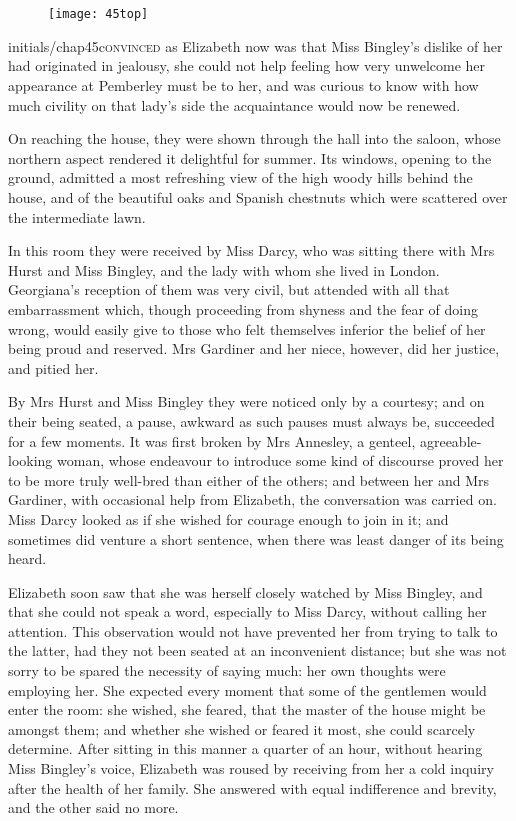 \chapter[Chapter \thechapter]{}
	
	
\begin{figure}[t!]
\centering
\texttt{[image: 45top]}
\end{figure}


\lettrine[lines=6,image=true]{initials/chap45c}{onvinced}  as Elizabeth now was that Miss Bingley's dislike of her had originated in jealousy, she could not help feeling how very unwelcome her appearance at Pemberley must be to her, and was curious to know with how much civility on that lady's side the acquaintance would now be renewed.

\zz
On reaching the house, they were shown through the hall into the saloon, whose northern aspect rendered it delightful for summer. Its windows, opening to the ground, admitted a most refreshing view of the high woody hills behind the house, and of the beautiful oaks and Spanish chestnuts which were scattered over the intermediate lawn.

In this room they were received by Miss Darcy, who was sitting there with Mrs Hurst and Miss Bingley, and the lady with whom she lived in London. Georgiana's reception of them was very civil, but attended with all that embarrassment which, though proceeding from shyness and the fear of doing wrong, would easily give to those who felt themselves inferior the belief of her being proud and reserved. Mrs Gardiner and her niece, however, did her justice, and pitied her.

By Mrs Hurst and Miss Bingley they were noticed only by a courtesy; and on their being seated, a pause, awkward as such pauses must always be, succeeded for a few moments. It was first broken by Mrs Annesley, a genteel, agreeable-looking woman, whose endeavour to introduce some kind of discourse proved her to be more truly well-bred than either of the others; and between her and Mrs Gardiner, with occasional help from Elizabeth, the conversation was carried on. Miss Darcy looked as if she wished for courage enough to join in it; and sometimes did venture a short sentence, when there was least danger of its being heard.

Elizabeth soon saw that she was herself closely watched by Miss Bingley, and that she could not speak a word, especially to Miss Darcy, without calling her attention. This observation would not have prevented her from trying to talk to the latter, had they not been seated at an inconvenient distance; but she was not sorry to be spared the necessity of saying much: her own thoughts were employing her. She expected every moment that some of the gentlemen would enter the room: she wished, she feared, that the master of the house might be amongst them; and whether she wished or feared it most, she could scarcely determine. After sitting in this manner a quarter of an hour, without hearing Miss Bingley's voice, Elizabeth was roused by receiving from her a cold inquiry after the health of her family. She answered with equal indifference and brevity, and the other said no more.

